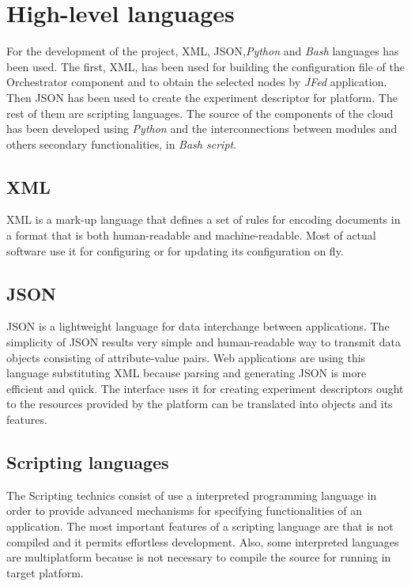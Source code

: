 \section{High-level languages}
\label{sec:high-level-languages}
For the development of the project, \ac{XML}, \ac{JSON},\emph{Python} and \emph{Bash} languages has
been used. The first, \ac{XML}, has been used for building the configuration file of
the Orchestrator component and to obtain the selected nodes by \emph{JFed}
application. Then \ac{JSON} has been used to create the experiment descriptor for
\bonfire platform. The rest of them are scripting languages. The source of the
components of the cloud has been developed using \emph{Python} and the interconnections
between modules and others secondary functionalities, in \emph{Bash script}.

\subsection{XML}
\ac{XML} is a mark-up language that defines a set of rules for encoding
documents in a format that is both human-readable and machine-readable. Most of
actual software use it for configuring or for updating its configuration on fly.

\subsection{JSON}

\ac{JSON} is a lightweight language for data interchange between applications. The
simplicity of \ac{JSON} results very simple and human-readable way to transmit data
objects consisting of attribute-value pairs. Web applications are using this
language substituting \ac{XML} because parsing and generating \ac{JSON} is more efficient
and quick. The \bonfire interface uses it for creating experiment descriptors
ought to the resources provided by the platform can be translated into objects
and its features.

\subsection{Scripting languages}

The Scripting technics consist of use a interpreted programming language in
order to provide advanced mechanisms for specifying functionalities of an
application. The most important features of a scripting language are that is not
compiled and it permits effortless development. Also, some interpreted languages
are multiplatform because is not necessary to compile the source for running in
target platform. 


